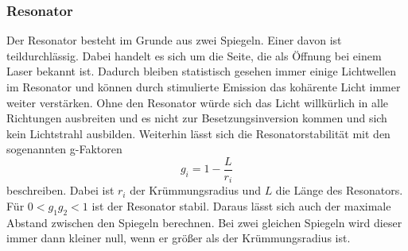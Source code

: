 
\subsubsection*{Resonator}
Der Resonator besteht im Grunde aus zwei Spiegeln.
Einer davon ist teildurchlässig. Dabei handelt es sich um die Seite, die als Öffnung bei einem Laser bekannt ist.
Dadurch bleiben statistisch gesehen immer einige Lichtwellen im Resonator und können durch stimulierte Emission das kohärente Licht immer weiter verstärken.
Ohne den Resonator würde sich das Licht willkürlich in alle Richtungen ausbreiten und es nicht zur Besetzungsinversion kommen und sich kein Lichtstrahl ausbilden.
Weiterhin lässt sich die Resonatorstabilität mit den sogenannten g-Faktoren 
\begin{equation} \label{eq:gfaktor}
    g_i = 1 - \frac{L}{r_i}
\end{equation}
beschreiben. Dabei ist $r_i$ der Krümmungsradius und $L$ die Länge des Resonators.
Für $0 < g_1 g_2 < 1$ ist der Resonator stabil.
Daraus lässt sich auch der maximale Abstand zwischen den Spiegeln berechnen.
Bei zwei gleichen Spiegeln wird dieser immer dann kleiner null, wenn er größer als der Krümmungsradius ist.

